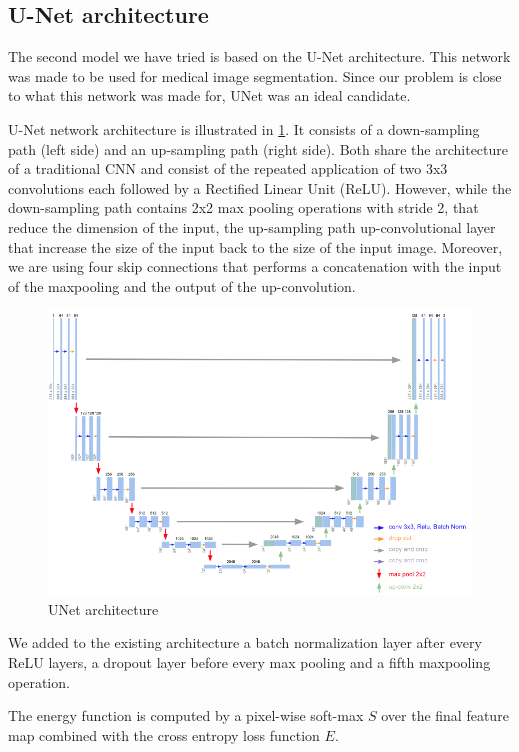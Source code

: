 \documentclass[10pt,conference,compsocconf]{IEEEtran}
\begin{document}
\subsection{U-Net architecture}
The second model we have tried is based on the U-Net architecture. This network was made to be used for medical image segmentation. Since our problem is close to what this network was made for, UNet was an ideal candidate.

U-Net network architecture is illustrated in \ref{fig:unet}. It consists of a down-sampling path (left side) and an up-sampling path (right side). Both share the architecture of a traditional CNN and consist of the repeated application of two 3x3 convolutions each followed by a Rectified Linear Unit (ReLU). However, while the down-sampling path contains 2x2 max pooling operations with stride 2, that reduce the dimension of the input, the up-sampling path up-convolutional layer  that increase the size of the input back to the size of the input image. Moreover, we are using four skip connections that performs a concatenation with the input of the maxpooling and the output of the up-convolution.

\begin{figure}[h]
  \centering
  \includegraphics[width=0.95\columnwidth]{img/unet.png}
  \caption{UNet architecture}
  \label{fig:unet}
\end{figure}

We added to the existing architecture a batch normalization layer after every ReLU layers, a dropout layer before every max pooling and a fifth maxpooling operation.

The energy function is computed by a pixel-wise soft-max $S$ over the final feature map combined with the cross entropy loss function $E$.
\end{document}
